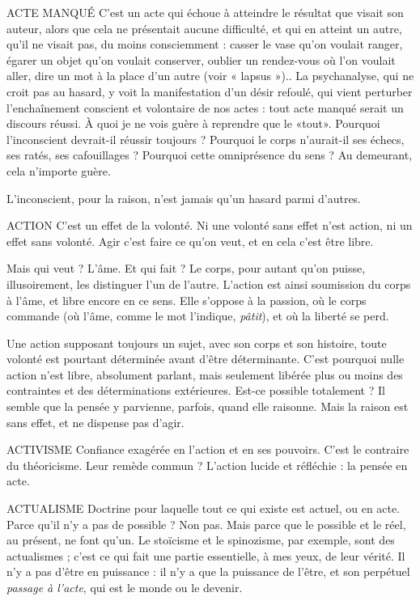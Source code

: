 ACTE MANQUÉ C’est un acte qui échoue à atteindre le résultat que visait
son auteur, alors que cela ne présentait aucune difficulté,
et qui en atteint un autre, qu'il ne visait pas, du moins consciemment : casser
le vase qu’on voulait ranger, égarer un objet qu’on voulait conserver, oublier un
rendez-vous où l’on voulait aller, dire un mot à la place d’un autre (voir
« lapsus »).. La psychanalyse, qui ne croit pas au hasard, y voit la manifestation
d’un désir refoulé, qui vient perturber l’enchaînement conscient et volontaire
de nos actes : tout acte manqué serait un discours réussi. À quoi je ne vois
guère à reprendre que le «tout». Pourquoi l'inconscient devrait-il réussir
toujours ? Pourquoi le corps n’aurait-il ses échecs, ses ratés, ses cafouillages ?
Pourquoi cette omniprésence du sens ? Au demeurant, cela n'importe guère.

L’inconscient, pour la raison, n’est jamais qu’un hasard parmi d’autres.

ACTION C’est un effet de la volonté. Ni une volonté sans effet n’est action, ni
un effet sans volonté. Agir c’est faire ce qu’on veut, et en cela c’est
être libre.

Mais qui veut ? L'âme. Et qui fait ? Le corps, pour autant qu’on puisse,
illusoirement, les distinguer l’un de l’autre. L’action est ainsi soumission du
corps à l’âme, et libre encore en ce sens. Elle s'oppose à la passion, où le
corps commande (où l’âme, comme le mot l’indique, {\it pâtit}), et où la liberté
se perd.

Une action supposant toujours un sujet, avec son corps et son histoire,
toute volonté est pourtant déterminée avant d’être déterminante. C’est pourquoi
nulle action n’est libre, absolument parlant, mais seulement libérée plus
ou moins des contraintes et des déterminations extérieures. Est-ce possible
totalement ? Il semble que la pensée y parvienne, parfois, quand elle raisonne.
Mais la raison est sans effet, et ne dispense pas d’agir.

ACTIVISME Confiance exagérée en l’action et en ses pouvoirs. C’est le contraire
du théoricisme. Leur remède commun ? L'action lucide et
réfléchie : la pensée en acte.

ACTUALISME Doctrine pour laquelle tout ce qui existe est actuel, ou en acte.
Parce qu’il n’y a pas de possible ? Non pas. Mais parce que le
possible et le réel, au présent, ne font qu’un. Le stoïcisme et le spinozisme, par
exemple, sont des actualismes ; c’est ce qui fait une partie essentielle, à mes
yeux, de leur vérité. Il n’y a pas d’être en puissance : il n’y a que la puissance de
l'être, et son perpétuel {\it passage à l'acte}, qui est le monde ou le devenir.

